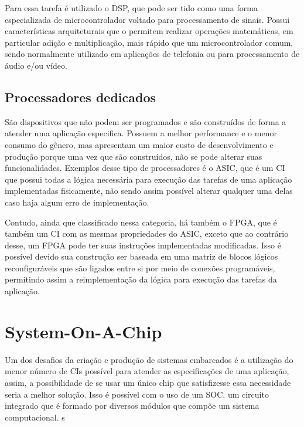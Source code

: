     Para essa tarefa é utilizado o \gls{DSP}, que pode ser tido como uma forma especializada de microcontrolador voltado para processamento de sinais. Possui características arquiteturais que o permitem realizar operações matemáticas, em particular adição e multiplicação, mais rápido que um microcontrolador comum, sendo normalmente utilizado em aplicações de telefonia ou para processamento de áudio e/ou vídeo.
    
    
    \subsection{Processadores dedicados } São dispositivos que não podem ser programados e são construídos de forma a atender uma aplicação especifica. Possuem a melhor performance e o menor consumo do gênero, mas apresentam um maior custo de desenvolvimento e produção porque uma vez que são construídos, não se pode alterar suas funcionalidades. Exemplos desse tipo de processadores é o \gls{ASIC}, que é um \gls{CI} que possui todas a lógica necessária para execução das tarefas de uma aplicação implementadas fisicamente, não sendo assim possível alterar qualquer uma delas caso haja algum erro de implementação. 
    
    Contudo, ainda que classificado nessa categoria, há também o \gls{FPGA}, que é também um \gls{CI} com as mesmas propriedades do \gls{ASIC}, exceto que ao contrário desse, um \gls{FPGA} pode ter suas instruções implementadas modificadas. Isso é possível devido sua construção ser baseada em uma matriz de blocos lógicos reconfiguráveis que são ligados entre si por meio de conexões programáveis, permitindo assim a reimplementação da lógica para execução das tarefas da aplicação.



\section{System-On-A-Chip}

Um dos desafios da criação e produção de sistemas embarcados é a utilização do menor número de \gls{CI}s possível para atender as especificações de uma aplicação, assim, a possibilidade de se usar um único chip que satisfizesse essa necessidade seria a melhor solução. Isso é possível com o uso de um \gls{SOC}, um circuito integrado que é formado por diversos módulos que compõe um sistema computacional. \cite{hamacher2011computer}s

